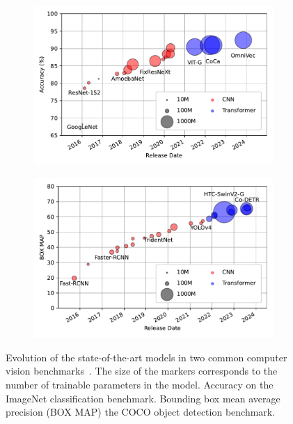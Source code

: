 \begin{figure}[h]
    \centering
    \begin{subfigure}[b]{0.49\textwidth}
        \centering
        \includegraphics[width=\textwidth]{Figures/graph_networks/imagenet.pdf}
        \caption{}
        \label{fig:imagenet}
    \end{subfigure}
    \hfill
    \begin{subfigure}[b]{0.49\textwidth}
        \centering
        \includegraphics[width=\textwidth]{Figures/graph_networks/coco.pdf}
        \caption{}
        \label{fig:coco}
    \end{subfigure}
    \caption{Evolution of the state-of-the-art models in two common computer vision benchmarks~\cite{paperswithcode}. The size of the markers corresponds to the number of trainable parameters in the model.  Accuracy on the ImageNet classification benchmark.  Bounding box mean average precision (BOX MAP) the COCO object detection benchmark.}
    \label{fig:benchmarks}
\end{figure}


